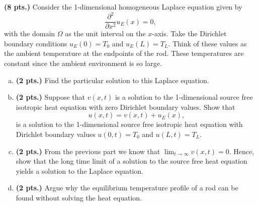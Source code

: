 \documentclass[12pt]{article} %
\begin{document}
\newpage

\begin{problem}
    \textbf{(8 pts.)} Consider the 1-dimensional homogeneous Laplace equation given by 
    \[
    \frac{\partial^2}{\partial x^2} u_E(x) = 0,
    \]
    with the domain $\Omega$ as the unit interval on the $x$-axis.  Take the Dirichlet boundary conditions $u_E(0)=T_0$ and $u_E(L)=T_L$.  Think of these values as the ambient temperature at the endpoints of the rod.  These temperatures are constant since the ambient environment is so large.

    \begin{enumerate}[(a)]
        \item \textbf{(2 pts.)} Find the particular solution to this Laplace equation.
        \item \textbf{(2 pts.)} Suppose that $v(x,t)$ is a solution to the 1-dimensional source free isotropic heat equation with zero Dirichlet boundary values. Show that 
        \[
        u(x,t)=v(x,t)+u_E(x),
        \]  
        is a solution to the 1-dimensional source free isotropic heat equation with Dirichlet boundary values $u(0,t)=T_0$ and $u(L,t)=T_L$.
        \item \textbf{(2 pts.)} From the previous part we know that $\lim_{t\to \infty} v(x,t) = 0$.  Hence, show that the long time limit of a solution to the source free heat equation yields a solution to the Laplace equation.
        \item \textbf{(2 pts.)} Argue why the equilibrium temperature profile of a rod can be found without solving the heat equation.
    \end{enumerate}
\end{problem}
\end{document}
